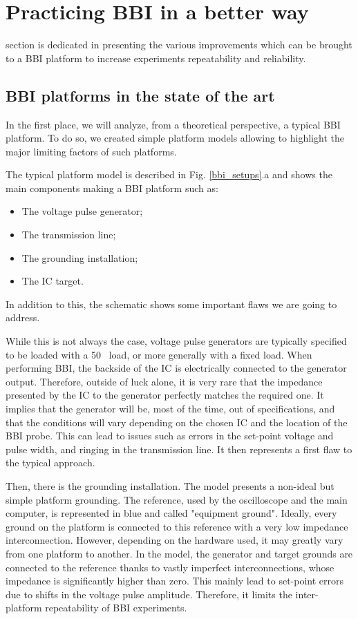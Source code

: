 
\section{Practicing BBI in a better way}
	 section is dedicated in presenting the various improvements which can be brought to a BBI platform to increase experiments repeatability and reliability.
	\subsection{BBI platforms in the state of the art}
		In the first place, we will analyze, from a theoretical perspective, a typical BBI platform.
		To do so, we created simple platform models allowing to highlight the major limiting factors of such platforms.
		
		The typical platform model is described in Fig. \ref{bbi_setups}.a and shows the main components making a BBI platform such as:
		\begin{itemize}
			\item The voltage pulse generator;
			\item The transmission line;
			\item The grounding installation;
			\item The IC target.
		\end{itemize}
		In addition to this, the schematic shows some important flaws we are going to address.

		While this is not always the case, voltage pulse generators are typically specified to be loaded with a 50 \textOmega\ load, or more generally with a fixed load.
		When performing BBI, the backside of the IC is electrically connected to the generator output.
		Therefore, outside of luck alone, it is very rare that the impedance presented by the IC to the generator perfectly matches the required one.
		It implies that the generator will be, most of the time, out of specifications, and that the conditions will vary depending on the chosen IC and the location of the BBI probe.
		This can lead to issues such as errors in the set-point voltage and pulse width, and ringing in the transmission line.
		It then represents a first flaw to the typical approach.

		Then, there is the grounding installation.
		The model presents a non-ideal but simple platform grounding.
		The reference, used by the oscilloscope and the main computer, is represented in blue and called "equipment ground".
		Ideally, every ground on the platform is connected to this reference with a very low impedance interconnection.
		However, depending on the hardware used, it may greatly vary from one platform to another.
		In the model, the generator and target grounds are connected to the reference thanks to vastly imperfect interconnections, whose impedance is significantly higher than zero.
		This mainly lead to set-point errors due to shifts in the voltage pulse amplitude.
		Therefore, it limits the inter-platform repeatability of BBI experiments.

